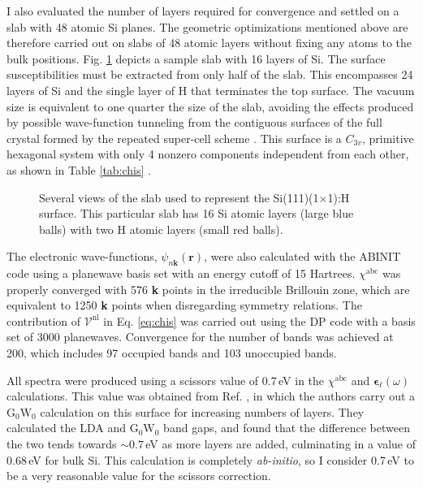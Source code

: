 I also evaluated the number of layers required for convergence and settled on a
slab with 48 atomic Si planes. The geometric optimizations mentioned above are
therefore carried out on slabs of 48 atomic layers without fixing any atoms to
the bulk positions. Fig. \ref{fig:1x1struc} depicts a sample slab with 16 layers
of Si. The surface susceptibilities must be extracted from only half of the
slab. This encompasses 24 layers of Si and the single layer of H that terminates
the top surface. The vacuum size is equivalent to one quarter the size of the
slab, avoiding the effects produced by possible wave-function tunneling from the
contiguous surfaces of the full crystal formed by the repeated super-cell scheme
\cite{mendozaPRB06}. This surface is a $C_{3v}$, primitive hexagonal system with
only 4 nonzero components independent from each other, as shown in Table
\ref{tab:chis} \cite{popovbook, sipePRB87, mizrahiJOSA88}.

\begin{figure}[H]
\centering
{}\hfill
{}\hfill
{}
    \caption{Several views of the slab used to represent the
    Si(111)(1$\times$1):H surface. This particular slab has 16 Si atomic layers
    (large blue balls) with two H atomic layers (small red balls).}
\label{fig:1x1struc}
\end{figure}

The electronic wave-functions, $\psi_{n\mathbf{k}}(\mathbf{r})$, were also
calculated with the ABINIT code using a planewave basis set with an energy
cutoff of 15 Hartrees. $\chi^{\mathrm{abc}}$ was properly converged with 576
\textbf{k} points in the irreducible Brillouin zone, which are equivalent to
1250 \textbf{k} points when disregarding symmetry relations. The contribution of
$\boldsymbol{\mathcal{V}}^\mathrm{nl}$ in Eq. \eqref{eq:chis} was carried out
using the DP\cite{olevanoDP} code with a basis set of 3000 planewaves.
Convergence for the number of bands was achieved at 200, which includes 97
occupied bands and 103 unoccupied bands.

All spectra were produced using a scissors value of 0.7\,eV in the
$\chi^{\mathrm{abc}}$ and $\boldsymbol{\epsilon}_{\ell}(\omega)$ calculations.
This value was obtained from Ref. \cite{liPRB10}, in which the authors carry out
a $\mathrm{G}_{0}\mathrm{W}_{0}$ calculation on this surface for increasing
numbers of layers. They calculated the LDA and $\mathrm{G}_{0}\mathrm{W}_{0}$
band gaps, and found that the difference between the two tends towards
$\sim0.7$\,eV as more layers are added, culminating in a value of 0.68\,eV for
bulk Si. This calculation is completely \emph{ab-initio}, so I consider 0.7\,eV
to be a very reasonable value for the scissors correction.

